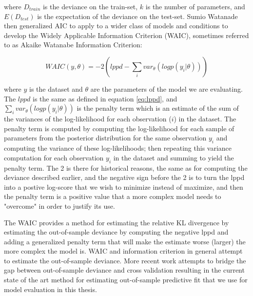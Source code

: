where $D_{train}$ is the deviance on the train-set, $k$ is the number of parameters, and $E(D_{test})$ is the expectation of the deviance on the test-set. Sumio Watanade then generalized AIC to apply to a wider class of models and conditions to develop the Widely Applicable Information Criterion (WAIC), sometimes referred to as Akaike Watanabe Information Criterion:

\begin{equation} \label{eq:waic}
WAIC(y, \theta) = -2 \left( lppd - \sum_i var_{\theta}(logp(y_i|\theta)) \right)
\end{equation}

where $y$ is the dataset and $\theta$ are the parameters of the model we are evaluating. The $lppd$ is the same as defined in equation \ref{eq:lppd}, and $\sum_i var_{\theta}(logp(y_i|\theta))$ is the penalty term which is an estimate of the sum of the variances of the log-likelihood for each observation ($i$) in the dataset. The penalty term is computed by computing the log-likelihood for each sample of parameters from the posterior distribution for the same observation $y_i$ and computing the variance of these log-likelihoods; then repeating this variance computation for each observation $y_i$ in the dataset and summing to yield the penalty term. The 2 is there for historical reasons, the same as for computing the deviance described earlier, and the negative sign before the 2 is to turn the lppd into a postive log-score that we wish to minimize instead of maximize, and then the penalty term is a positive value that a more complex model needs to "overcome" in order to justify its use.

The WAIC provides a method for estimating the relative KL divergence by estimating the out-of-sample deviance by computing the negative lppd and adding a generalized penalty term that will make the estimate worse (larger) the more complex the model is. WAIC and information criterion in general attempt to estimate the out-of-sample deviance. More recent work attempts to bridge the gap between out-of-sample deviance and cross validation resulting in the current state of the art method for estimating out-of-sample predictive fit that we use for model evaluation in this thesis.

